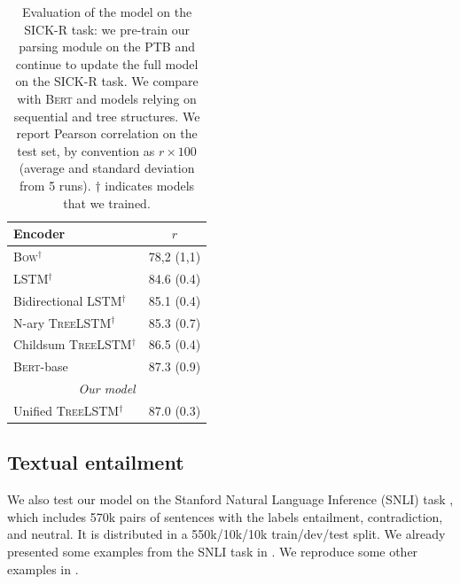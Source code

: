\begin{table}[!htb]
\centering
\small
\begin{tabularx}{\textwidth}{@{}X | c@{} }
\toprule
\textbf{Encoder} & \textbf{$r$} \\
\midrule
\midrule 
\textsc{Bow}$^\dagger$ & 78,2 \scriptsize{(1,1)} \\
\textsc{LSTM}$^\dagger$ & 84.6 \scriptsize{(0.4)}  \\
Bidirectional \textsc{LSTM}$^\dagger$ & 85.1 \scriptsize{(0.4)} \\
N-ary \textsc{TreeLSTM}$^\dagger$ \parencite{tai_15} & 85.3 \scriptsize{(0.7)} \\
Childsum \textsc{TreeLSTM}$^\dagger$ \parencite{tai_15} & 86.5 \scriptsize{(0.4)}  \\
\textsc{Bert}-base \parencite{devlin_19} & 87.3 \scriptsize{(0.9)} \\
\midrule
\multicolumn{2}{c}{\textit{Our model}}\\
\midrule
Unified \textsc{TreeLSTM}$^\dagger$ & 87.0 \scriptsize{(0.3)} \\
\bottomrule
\end{tabularx}
\caption{Evaluation of the model on the SICK-R task: we pre-train our parsing module on the PTB and continue to update the full model on the SICK-R task. We compare with \textsc{Bert} and models relying on sequential and tree structures. We report Pearson correlation on the test set, by convention as $r \times 100$ (average and standard deviation from 5 runs). $\dagger$ indicates models that we trained.}
\label{table:supervised}
\end{table}

\subsection{Textual entailment}
\label{sec:ste}

We also test our model on the Stanford Natural Language Inference (SNLI) task \parencite{bowman_15}, which includes 570k pairs of sentences with the labels entailment, contradiction, and neutral. It is distributed in a 550k/10k/10k train/dev/test split. We already presented some examples from the SNLI task in . We reproduce some other examples in .

